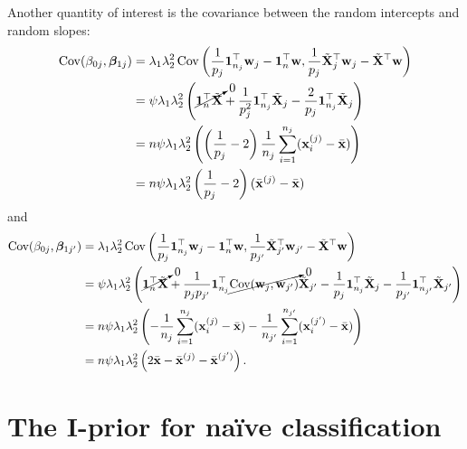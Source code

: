 Another quantity of interest is the covariance between the random intercepts and random slopes:
\begin{align*}
  \operatorname{Cov}(\beta_{0j}, \boldsymbol{\beta}_{1j}) 
  &= \lambda_1\lambda_2^2  \operatorname{Cov}\left( \frac{1}{p_{j}} {\mathbf 1}_{n_j}^\top {\mathbf w}_{j} - {\mathbf 1}_n^\top {\mathbf w}, \frac{1}{p_{j}} \tilde{{\mathbf X}}_{j}^\top {\mathbf w}_{j} - \tilde{{\mathbf X}}^\top {\mathbf w}   \right) \\
  &= \psi\lambda_1\lambda_2^2  \left( \cancelto{0}{{\mathbf 1}_{n}^\top \tilde{{\mathbf X}}} + \frac{1}{p_{j}^2} {\mathbf 1}_{n_j}^\top \tilde{{\mathbf X}}_j  - \frac{2}{p_{j}} {\mathbf 1}_{n_{j}}^\top \tilde{{\mathbf X}}_{j} \right) \\
  &= n\psi\lambda_1\lambda_2^2  \left(  \left(\frac{1}{p_j} - 2 \right) \frac{1}{n_{j}} \sum_{i=1}^{n_j}({\mathbf x}_i^{(j)} - \bar {{\mathbf x}})  \right) \\
  &= n\psi\lambda_1\lambda_2^2 \left(\frac{1}{p_j} - 2 \right) ( \bar{{\mathbf x}}^{(j)}   -\bar {{\mathbf x}}  ) 
\end{align*}
and
\begin{align*}
  \operatorname{Cov}(\beta_{0j}, \boldsymbol{\beta}_{1j'}) 
  &= \lambda_1\lambda_2^2  \operatorname{Cov}\left( \frac{1}{p_{j}} {\mathbf 1}_{n_j}^\top {\mathbf w}_{j} - {\mathbf 1}_n^\top {\mathbf w}, \frac{1}{p_{j'}} \tilde{{\mathbf X}}_{j'}^\top {\mathbf w}_{j'} - \tilde{{\mathbf X}}^\top {\mathbf w}   \right) \\
  &= \psi\lambda_1\lambda_2^2  \left( \cancelto{0}{{\mathbf 1}_{n}^\top \tilde{{\mathbf X}}} + \frac{1}{p_{j}p_{j'}} {\mathbf 1}_{n_j}^\top \cancelto{0}{\operatorname{Cov}({\mathbf w}_j,{\mathbf w}_{j'})} \tilde{{\mathbf X}}_{j'} - \frac{1}{p_{j}} {\mathbf 1}_{n_j}^\top \tilde{{\mathbf X}}_j  - \frac{1}{p_{j'}} {\mathbf 1}_{n_{j'}}^\top \tilde{{\mathbf X}}_{j'} \right) \\
  &= n\psi\lambda_1\lambda_2^2  \left(  - \frac{1}{n_{j}} \sum_{i=1}^{n_j}({\mathbf x}_i^{(j)} - \bar {{\mathbf x}})  - \frac{1}{n_{j'}} \sum_{i=1}^{n_{j'}}({\mathbf x}_i^{(j')} - \bar {{\mathbf x}}) \right) \\
  &= n\psi\lambda_1\lambda_2^2  \left(  2\bar {{\mathbf x}} -  \bar{{\mathbf x}}^{(j)}  -  \bar {{\mathbf x}}^{(j')}  \right).
\end{align*}


\section{The I-prior for naïve classification}


